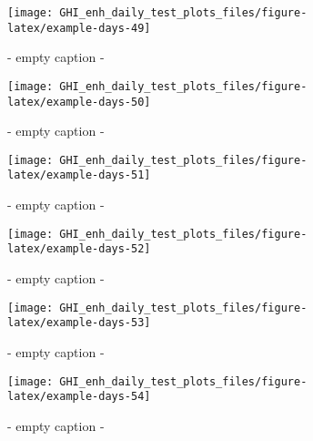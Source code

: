 \documentclass[
  10pt,
  a4paper,oneside]{article}
\begin{document}
\begin{figure}[H]

{\centering \texttt{[image: GHI\_enh\_daily\_test\_plots\_files/figure-latex/example-days-49]} 

}

\caption{ - empty caption - }\label{fig:example-days-49}
\end{figure}

\begin{figure}[H]

{\centering \texttt{[image: GHI\_enh\_daily\_test\_plots\_files/figure-latex/example-days-50]} 

}

\caption{ - empty caption - }\label{fig:example-days-50}
\end{figure}

\begin{figure}[H]

{\centering \texttt{[image: GHI\_enh\_daily\_test\_plots\_files/figure-latex/example-days-51]} 

}

\caption{ - empty caption - }\label{fig:example-days-51}
\end{figure}

\begin{figure}[H]

{\centering \texttt{[image: GHI\_enh\_daily\_test\_plots\_files/figure-latex/example-days-52]} 

}

\caption{ - empty caption - }\label{fig:example-days-52}
\end{figure}

\begin{figure}[H]

{\centering \texttt{[image: GHI\_enh\_daily\_test\_plots\_files/figure-latex/example-days-53]} 

}

\caption{ - empty caption - }\label{fig:example-days-53}
\end{figure}

\begin{figure}[H]

{\centering \texttt{[image: GHI\_enh\_daily\_test\_plots\_files/figure-latex/example-days-54]} 

}

\caption{ - empty caption - }\label{fig:example-days-54}
\end{figure}
\end{document}

